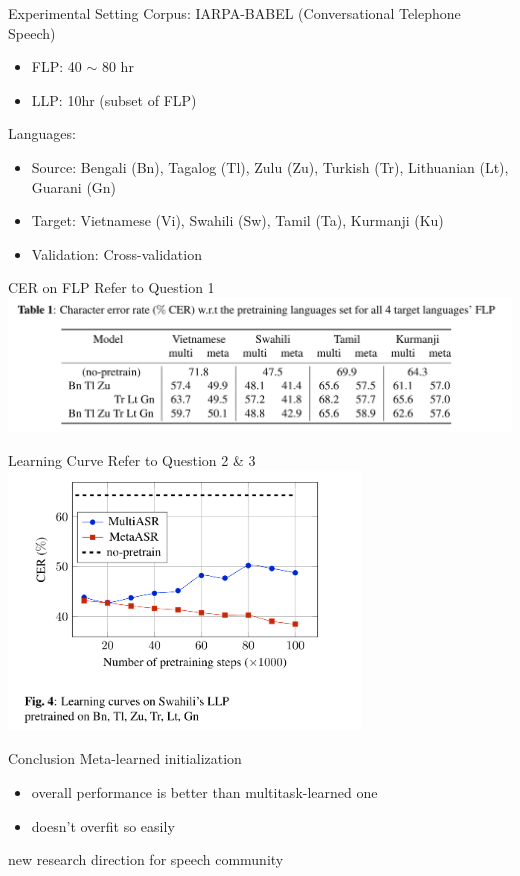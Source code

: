 \documentclass{beamer}
\begin{document}
\begin{frame}[t]{Experimental Setting}
  Corpus: IARPA-BABEL (Conversational Telephone Speech)
  \begin{itemize}
    \item FLP: 40 $\sim$ 80 hr
    \item LLP: 10hr (subset of FLP)
  \end{itemize}
  \pause
  Languages:
  \begin{itemize}
    \item Source: Bengali (Bn), Tagalog (Tl), Zulu (Zu), Turkish (Tr), Lithuanian (Lt), Guarani (Gn)
    \item Target: Vietnamese (Vi), Swahili (Sw), Tamil (Ta), Kurmanji (Ku)
    \item Validation: Cross-validation
  \end{itemize}
\end{frame}

\begin{frame}[t]{CER on FLP}
  Refer to Question 1
  \center \includegraphics[width=1.0\textwidth]{fig/flp_table.png}
\end{frame}

\begin{frame}[t]{Learning Curve}
  Refer to Question 2 \& 3
  \center \includegraphics[width=0.7\textwidth]{fig/lr.png}
\end{frame}

\begin{frame}[t]{Conclusion}
  Meta-learned initialization
  \begin{itemize}
    \item overall performance is better than multitask-learned one
    \item doesn't overfit so easily
  \end{itemize}
  \pause
  \vspace{3em}
  \center new research direction for speech community
\end{frame}
\end{document}
